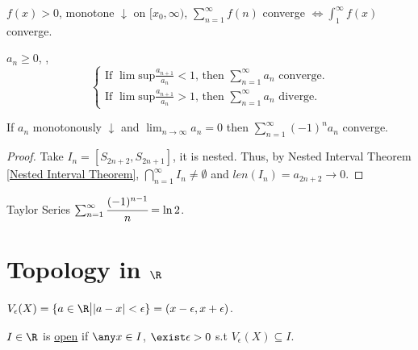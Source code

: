 \begin{theorem}
\label{Integral Test}
    $f(x)>0$, monotone $\downarrow$ on $[x_0, \infty)$, $\sum_{n=1}^\infty f(n)$ converge $\Leftrightarrow \int_1^\infty f(x)$ converge.
\end{theorem}

\begin{theorem}
\label{Ratio Test}
    $a_n \geq0$, ,
    $$\begin{cases}
        \text{If }\lim \text{sup} \frac{a_{n+1}}{a_n} <1 \text{, then } \sum_{n=1}^\infty a_n \text{ converge}.\\
        \text{If }\lim \text{sup} \frac{a_{n+1}}{a_n} >1 \text{, then } \sum_{n=1}^\infty a_n \text{ diverge}.
    \end{cases}$$
\end{theorem}

\begin{theorem}
\label{Alternative Series Test}
    If $a_n$ monotonously  $\downarrow$ and  $\lim_{n\to\infty} a_n =0$ then $\sum_{n=1}^\infty (-1)^n a_n$ converge. 
\end{theorem}
\begin{proof}
    Take $I_n = [S_{2n+2}, S_{2n+1}]$, it is nested. Thus, by Nested Interval Theorem \ref{Nested Interval Theorem}, $\bigcap\limits_{n=1}^{\infty} I_n \neq \emptyset$ and $len(I_n) = a_{2n+2} \rightarrow 0$.
\end{proof}
\begin{example}
    Taylor Series $\sum_{n=1}^\infty \cfrac{(-1)^{n-1}}{n} = \ln 2$.
\end{example}    


\section{Topology in $\R$}
\begin{definition}
    $V_\epsilon (X) = \{ a \in \R \bigl| |a-x| < \epsilon \} = (x-\epsilon, x+ \epsilon)$.
\end{definition}
\begin{definition}
    $I \in \R$ is \uline{open} if $\any x \in I$, $\exist \epsilon>0$ s.t $V_\epsilon (X) \subseteq I$.
\end{definition}

